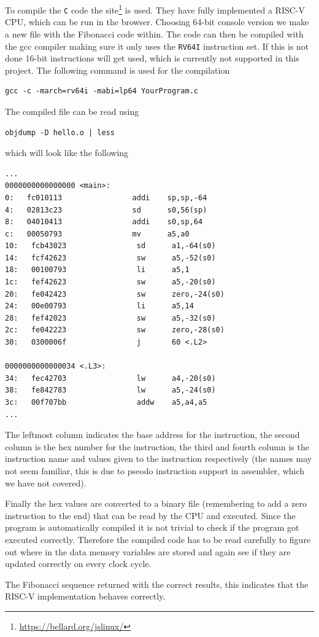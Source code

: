        To compile the \texttt{C} code the site\footnote{\url{https://bellard.org/jslinux/} } is used. They have fully implemented a RISC-V CPU, which can be run in the browser. Choosing 64-bit console version we make a new file with the Fibonacci code within. The code can then be compiled with the gcc compiler making sure it only uses the \texttt{RV64I} instruction set. If this is not done 16-bit instructions will get used, which is currently not supported in this project. The following command is used for the compilation
        \begin{lstlisting}[language={[Sharp]C}]
gcc -c -march=rv64i -mabi=lp64 YourProgram.c
        \end{lstlisting}
        The compiled file can be read using
        \begin{lstlisting}[language={[Sharp]C}]
objdump -D hello.o | less
        \end{lstlisting} 
        which will look like the following
        \begin{lstlisting}[language={[Sharp]C}]
...
0000000000000000 <main>:
0:   fc010113                addi    sp,sp,-64
4:   02813c23                sd      s0,56(sp)
8:   04010413                addi    s0,sp,64
c:   00050793                mv      a5,a0
10:   fcb43023                sd      a1,-64(s0)
14:   fcf42623                sw      a5,-52(s0)
18:   00100793                li      a5,1
1c:   fef42623                sw      a5,-20(s0)
20:   fe042423                sw      zero,-24(s0)
24:   00e00793                li      a5,14
28:   fef42023                sw      a5,-32(s0)
2c:   fe042223                sw      zero,-28(s0)
30:   0300006f                j       60 <.L2>

0000000000000034 <.L3>:
34:   fec42703                lw      a4,-20(s0)
38:   fe842783                lw      a5,-24(s0)
3c:   00f707bb                addw    a5,a4,a5
...
        \end{lstlisting} 
        The leftmost column indicates the base address for the instruction, the second column is the hex number for the instruction, the third and fourth column is the instruction name and values given to the instruction respectively (the names may not seem familiar, this is due to pseodo instruction support in assembler, which we have not covered).
        
        Finally the hex values are converted to a binary file (remembering to add a zero instruction to the end) that can be read by the CPU and executed. Since the program is automatically compiled it is not trivial to check if the program got executed correctly. Therefore the compiled code has to be read carefully to figure out where in the data memory variables are stored and again see if they are updated correctly on every clock cycle. 
        
        The Fibonacci sequence returned with the correct results, this indicates that the RISC-V implementation behaves correctly.
    